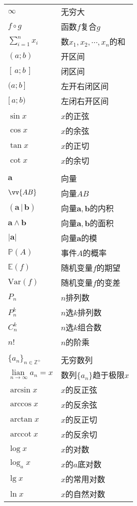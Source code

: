 \documentclass[12pt,UTF8]{article}
\newcommand{\lian}[1]{
    \underset{#1}{\operatorname{lian}\,}
}
\newcommand{\arccot}{\operatorname{arccot}}
\begin{document}
\begin{longtable}{ m{15em} m{15em} }
    $\infty$ & 无穷大 \\
    $f\circ g$ & 函数$f$复合$g$ \\
    $\displaystyle\sum_{i=1}^n x_i$ & 数$x_1, x_2, \cdots, x_n$的和 \\
    $(a;b)$ & 开区间 \\
    $[\,a;b\,]$ & 闭区间 \\
    $(a;b\,]$ & 左开右闭区间 \\
    $[\,a;b)$ & 左闭右开区间 \\
    $\sin{x}$ & $x$的正弦 \\
    $\cos{x}$ & $x$的余弦 \\
    $\tan{x}$ & $x$的正切 \\
    $\cot{x}$ & $x$的余切 \\
    & \\
    $\mathbf{a}$ & 向量 \\
    $\vv{AB}$ & 向量$AB$\\
    $(\mathbf{a}\, | \, \mathbf{b})$ & 向量$\mathbf{a},\mathbf{b}$的内积 \\
    $\mathbf{a}\wedge \mathbf{b}$ & 向量$\mathbf{a},\mathbf{b}$的面积 \\
    $|\mathbf{a}|$ & 向量$\mathbf{a}$的模 \\
    $\mathbb{P}(A)$ & 事件$A$的概率 \\
    $\mathbb{E}(f)$ & 随机变量$f$的期望 \\
    $\mathrm{Var}(f)$ & 随机变量$f$的变差 \\
    $P_n$ & $n$排列数 \\
    $P_n^k$ & $n$选$k$排列数 \\
    $C_n^k$ & $n$选$k$组合数 \\
    $n!$ & $n$的阶乘 \\
    & \\
    $\displaystyle\{a_n\}_{n\in\mathbb{Z}^+}$ & 无穷数列 \\
    $\lian{n\to \infty} a_n = x$ & 数列$\{a_n\}$趋于极限$x$ \\
    $\arcsin{x}$ & $x$的反正弦 \\
    $\arccos{x}$ & $x$的反余弦 \\
    $\arctan{x}$ & $x$的反正切 \\
    $\arccot{x}$ & $x$的反余切 \\
    $\log{x}$ & $x$的对数 \\
    $\log_a{x}$ & $x$的$a$底对数 \\
    $\lg{x}$ & $x$的常用对数 \\
    $\ln{x}$ & $x$的自然对数 \\

\end{longtable}
\end{document}
